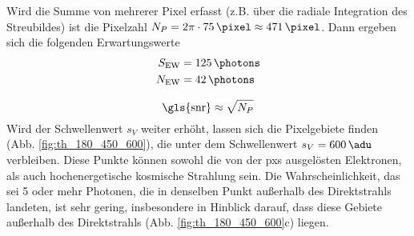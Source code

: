 \noindent
Wird die Summe von mehrerer Pixel erfasst (z.B. über die radiale Integration des Streubildes) ist die Pixelzahl $N_P = 2\pi\cdot\SI{75}{\pixel} \approx \SI{471}{\pixel}$. Dann ergeben sich die folgenden Erwartungswerte
\begin{equation}
    \begin{split}
        S_\text{EW} &= \SI{125}{\photons}\\
        N_\text{EW} &= \SI{42}{\photons}\\
    \end{split}
\end{equation}


\begin{equation}
    \text{\gls{snr}} \approx \sqrt{N_P}
\end{equation}
%     
%     
%     
\noindent
Wird der Schwellenwert $s_V$ weiter erhöht, lassen sich die Pixelgebiete finden (Abb. \ref{fig:th_180_450_600}), die unter dem Schwellenwert $s_V = \SI{600}{\adu}$ verbleiben. Diese Punkte können sowohl die von der \gls{pxs} ausgelösten Elektronen, als auch hochenergetische kosmische Strahlung sein. Die Wahrscheinlichkeit, das sei 5 oder mehr Photonen, die in denselben Punkt außerhalb des Direktstrahls landeten, ist sehr gering, insbesondere in Hinblick darauf, dass diese Gebiete außerhalb des Direktstrahls (Abb. \ref{fig:th_180_450_600}c) liegen.
